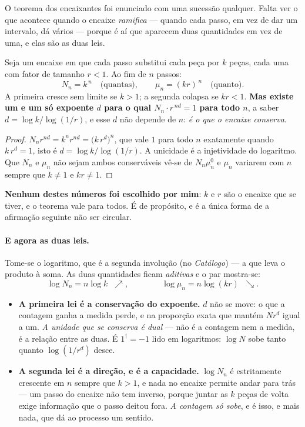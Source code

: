 \documentclass[livro.tex]{subfiles}
\begin{document}
\noindent O teorema dos encaixantes foi enunciado com uma sucessão qualquer. Falta ver o que
acontece quando o encaixe \emph{ramifica} --- quando cada passo, em vez de dar um intervalo, dá
vários --- porque é aí que aparecem duas quantidades em vez de uma, e elas são as duas leis.

\begin{teorema}\label{thm:entropia}
Seja um encaixe em que cada passo substitui cada peça por $k$ peças, cada uma com fator de
tamanho $r<1$. Ao fim de $n$ passos:
\[
  N_n = k^{\,n} \quad\text{(quantas)}, \qquad \mu_n = (k r)^{\,n} \quad\text{(quanto)} .
\]
A primeira cresce sem limite se $k>1$; a segunda colapsa se $kr<1$. \textbf{Mas existe um e um só
expoente $d$ para o qual $N_n\cdot r^{\,nd}=1$ para todo $n$}, a saber $d=\log k/\log(1/r)$, e esse
$d$ não depende de $n$: \emph{é o que o encaixe conserva}.
\end{teorema}

\begin{proof}
$N_n r^{nd}=k^n r^{nd}=\bigl(k\,r^{d}\bigr)^{n}$, que vale $1$ para todo $n$ exatamente quando
$k\,r^{d}=1$, isto é $d=\log k/\log(1/r)$. A unicidade é a injetividade do logaritmo. Que $N_n$ e
$\mu_n$ não sejam ambos conserváveis vê-se de $N_n\mu_n^{0}$ e $\mu_n$ variarem com $n$ sempre que
$k\neq1$ e $kr\neq1$.
\end{proof}

\noindent \textbf{Nenhum destes números foi escolhido por mim}: $k$ e $r$ são o encaixe que se
tiver, e o teorema vale para todos. É de propósito, e é a única forma de a afirmação seguinte não
ser circular.

\paragraph{E agora as duas leis.} Tome-se o logaritmo, que é a segunda involução
(no \emph{Catálogo}) --- a que leva o produto à soma. As duas quantidades ficam \emph{aditivas}
e o par mostra-se:
\[
  \log N_n = n\log k \;\; \nearrow, \qquad\qquad \log \mu_n = n\log(kr) \;\; \searrow .
\]

\begin{itemize}\itemsep2pt
\item \textbf{A primeira lei é a conservação do expoente.} $d$ não se move: o que a contagem ganha
a medida perde, e na proporção exata que mantém $N r^{d}$ igual a um. \emph{A unidade que se
conserva é dual} --- não é a contagem nem a medida, é a relação entre as duas. É $1^{\dagger}=-1$
lido em logaritmos: $\log N$ sobe tanto quanto $\log(1/r^{d})$ desce.

\item \textbf{A segunda lei é a direção, e é a capacidade.} $\log N_n$ é estritamente crescente em $n$ sempre que
$k>1$, e nada no encaixe permite andar para trás --- um passo do encaixe não tem inverso, porque
juntar as $k$ peças de volta exige informação que o passo deitou fora. \emph{A contagem só sobe},
e é isso, e mais nada, que dá ao processo um sentido.
\end{itemize}
\end{document}
